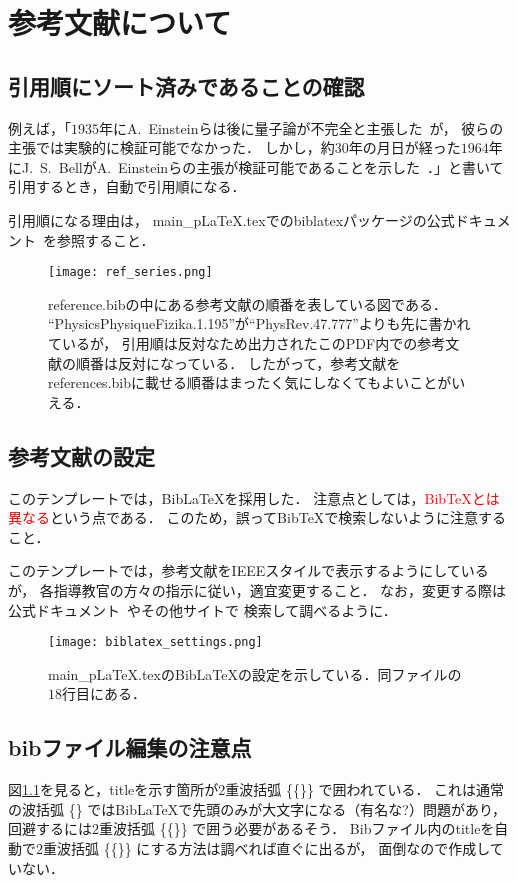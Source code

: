 \chapter{参考文献について}
\section{引用順にソート済みであることの確認}
例えば，「$1935$年にA.~Einsteinらは後に量子論が不完全と主張した~\cite{PhysRev.47.777}が，
彼らの主張では実験的に検証可能でなかった．
しかし，約$30$年の月日が経った$1964$年にJ.~S.~BellがA.~Einsteinらの主張が検証可能であることを示した~\cite{PhysicsPhysiqueFizika.1.195}．」と書いて引用するとき，自動で引用順になる．

引用順になる理由は，
main\_pLaTeX.texでのbiblatexパッケージの公式ドキュメント~\cite{biblatex}を参照すること．

\begin{figure}[h]
  \centering
  \texttt{[image: ref\_series.png]}
  \caption{reference.bibの中にある参考文献の順番を表している図である．
  ``PhysicsPhysiqueFizika.1.195''が``PhysRev.47.777''よりも先に書かれているが，
  引用順は反対なため出力されたこのPDF内での参考文献の順番は反対になっている．
  したがって，参考文献をreferences.bibに載せる順番はまったく気にしなくてもよいことがいえる．}
  \label{fig:ref_series}
\end{figure}

\section{参考文献の設定}
このテンプレートでは，Bib\LaTeX を採用した．
注意点としては，\textcolor{red}{Bib\TeX とは異なる}という点である．
このため，誤ってBib\TeX で検索しないように注意すること．

このテンプレートでは，参考文献をIEEEスタイルで表示するようにしているが，
各指導教官の方々の指示に従い，適宜変更すること．
なお，変更する際は公式ドキュメント~\cite{biblatex}やその他サイトで
検索して調べるように．

\begin{figure}[h]
  \centering
  \texttt{[image: biblatex\_settings.png]}
  \caption{main\_pLaTeX.texのBib\LaTeX の設定を示している．同ファイルの$18$行目にある．}
  \label{fig:biblatex_settings}
\end{figure}

\section{bibファイル編集の注意点}
図\ref{fig:ref_series}を見ると，titleを示す箇所が$2$重波括弧 \{\{\}\} で囲われている．
これは通常の波括弧 \{\} ではBib\LaTeX で先頭のみが大文字になる（有名な?）問題があり，
回避するには$2$重波括弧 \{\{\}\} で囲う必要があるそう．
Bibファイル内のtitleを自動で$2$重波括弧 \{\{\}\} にする方法は調べれば直ぐに出るが，
面倒なので作成していない．
